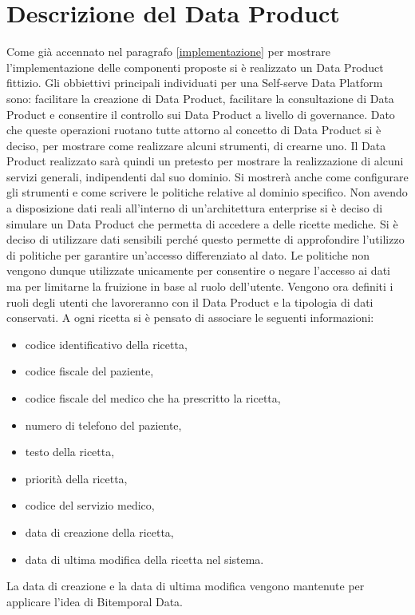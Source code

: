 \documentclass[12pt]{report}
\begin{document}
\section{Descrizione del Data Product}\label{caratteristicheDP}
Come già accennato nel paragrafo \ref{implementazione} per mostrare l'implementazione delle componenti proposte si è realizzato un Data Product fittizio.
Gli obbiettivi principali individuati per una Self-serve Data Platform sono: facilitare la creazione di Data Product, facilitare la consultazione di Data Product e consentire il controllo sui Data Product a livello di governance. 
Dato che queste operazioni ruotano tutte attorno al concetto di Data Product si è deciso, per mostrare come realizzare alcuni strumenti, di crearne uno.
Il Data Product realizzato sarà quindi un pretesto per mostrare la realizzazione di alcuni servizi generali, indipendenti dal suo dominio.
Si mostrerà anche come configurare gli strumenti e come scrivere le politiche relative al dominio specifico. 
Non avendo a disposizione dati reali all'interno di un'architettura enterprise si è deciso di simulare un Data Product che permetta di accedere a delle ricette mediche. 
Si è deciso di utilizzare dati sensibili perché questo permette di approfondire l'utilizzo di politiche per garantire un'accesso differenziato al dato.
Le politiche non vengono dunque utilizzate unicamente per consentire o negare l'accesso ai dati ma per limitarne la fruizione in base al ruolo dell'utente. 
Vengono ora definiti i ruoli degli utenti che lavoreranno con il Data Product e la tipologia di dati conservati.  
A ogni ricetta si è pensato di associare le seguenti informazioni:\begin{itemize}
    \item codice identificativo della ricetta,
    \item codice fiscale del paziente,
    \item codice fiscale del medico che ha prescritto la ricetta,
    \item numero di telefono del paziente,
    \item testo della ricetta,
    \item priorità della ricetta,
    \item codice del servizio medico,
    \item data di creazione della ricetta,
    \item data di ultima modifica della ricetta nel sistema. 
\end{itemize}
La data di creazione e la data di ultima modifica vengono mantenute per applicare l'idea di Bitemporal Data.
\end{document}
